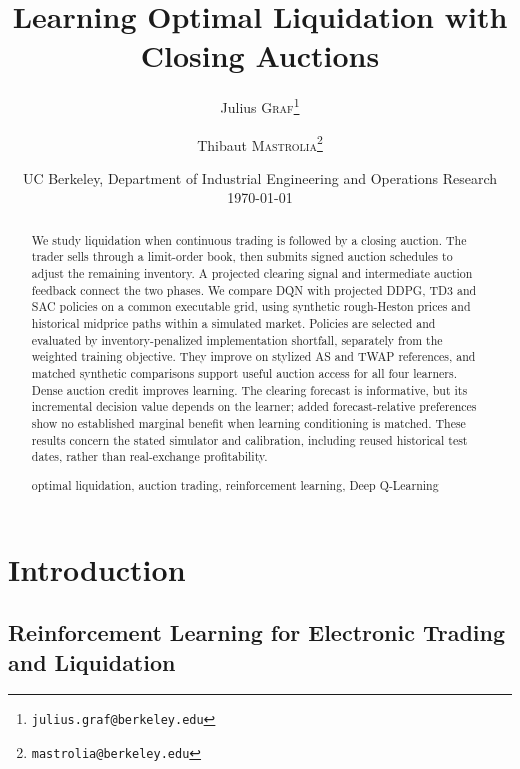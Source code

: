 \documentclass[11pt]{article}
\title{Learning {Optimal Liquidation} with Closing Auctions}
\author{
  Julius \textsc{Graf}\footnote{\texttt{julius.graf@berkeley.edu}}
  \and
  Thibaut \textsc{Mastrolia}\footnote{\texttt{mastrolia@berkeley.edu}}
}
\date{
  UC Berkeley, Department of Industrial Engineering and Operations Research
  \\[1em]
  \today
}
\begin{document}
\maketitle

\begin{abstract} 
\begingroup
We study liquidation when continuous trading is followed by a closing auction. The trader sells through a limit-order book, then submits signed auction schedules to adjust the remaining inventory. A projected clearing signal and intermediate auction feedback connect the two phases. We compare DQN with projected DDPG, TD3 and SAC policies on a common executable grid, using synthetic rough-Heston prices and historical midprice paths within a simulated market. Policies are selected and evaluated by inventory-penalized implementation shortfall, separately from the weighted training objective. They improve on stylized AS and TWAP references, and matched synthetic comparisons support useful auction access for all four learners. Dense auction credit improves learning. The clearing forecast is informative, but its incremental decision value depends on the learner; added forecast-relative preferences show no established marginal benefit when learning conditioning is matched. These results concern the stated simulator and calibration, including reused historical test dates, rather than real-exchange profitability.

\endgroup
\vspace{3mm}

 {optimal liquidation}, auction trading, reinforcement learning, Deep Q-Learning
\vspace{3mm}

 
\end{abstract}


\section{Introduction}

\subsection{Reinforcement Learning for Electronic Trading and Liquidation}
\end{document}
